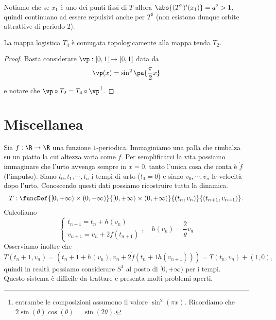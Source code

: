 \begin{example}
\begin{itemize}
Notiamo che se $x_1$ \`e uno dei punti fissi di $T$ allora $\abs{(T^2)'(x_1)}=a^2>1$, quindi continuano ad essere repulsivi anche per $T^2$ (non esistono dunque orbite attrattive di periodo 2).
\end{itemize}
\setlength{\leftmargini}{0.5cm}
\end{example}
    
\begin{remark}
La mappa logistica $T_4$ \`e coniugata topologicamente alla mappa tenda $T_2$.
\end{remark}
\begin{proof}
Basta considerare $\vp:[0,1]\to [0,1]$ data da
\[\vp(x)=\sin^2\pa{\frac\pi2x}\]
e notare che $\vp\circ T_2=T_4\circ \vp$\footnote{entrambe le composizioni assumono il valore $\sin^2(\pi x)$. Ricordiamo che $2\sin(\theta)\cos(\theta)=\sin(2\theta)$.}.
\end{proof}

\section{Miscellanea}
\begin{example}
Sia $f:\R\to \R$ una funzione $1$-periodica. Immaginiamo una palla che rimbalza su un piatto la cui altezza varia come $f$. Per semplificarci la vita possiamo immaginare che l'urto avvenga sempre in $x=0$, tanto l'unica cosa che conta \`e $\dot f$ (l'impulso). Siano $t_0,t_1,\cdots,t_n$ i tempi di urto ($t_0=0$) e siano $v_0,\cdots,v_n$ le velocit\`a dopo l'urto. Conoscendo questi dati possiamo ricostruire tutta la dinamica.
\[T:\funcDef{[0,+\infty)\times (0,+\infty)}{[0,+\infty)\times (0,+\infty)}{(t_{n},v_n)}{(t_{n+1},v_{n+1})}.\]
Calcoliamo
\[\begin{cases}
t_{n+1}=t_n+h(v_n)\\
v_{n+1}=v_n+2\dot f(t_{n+1})
\end{cases},\quad h(v_n)=\frac 2gv_n\]
Osserviamo inoltre che
\[T(t_n+1,v_n)=(t_n+1+h(v_n), v_n+2\dot f(t_n+1 h(v_{n+1})))=T(t_n,v_n)+(1,0),\]
quindi in realt\`a possiamo considerare $S^1$ al posto di $[0,+\infty)$ per i tempi.\\
Questo sistema \`e difficile da trattare e presenta molti problemi aperti.
\end{example}

